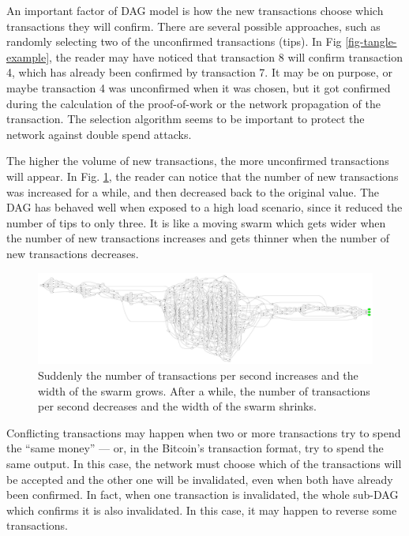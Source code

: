 An important factor of DAG model is how the new transactions choose which transactions they will confirm. There are several possible approaches, such as randomly selecting two of the unconfirmed transactions (tips). In Fig \ref{fig-tangle-example}, the reader may have noticed that transaction 8 will confirm transaction 4, which has already been confirmed by transaction 7. It may be on purpose, or maybe transaction 4 was unconfirmed when it was chosen, but it got confirmed during the calculation of the proof-of-work or the network propagation of the transaction. The selection algorithm seems to be important to protect the network against double spend attacks.

The higher the volume of new transactions, the more unconfirmed transactions will appear. In Fig. \ref{fig-tangle-swarm}, the reader can notice that the number of new transactions was increased for a while, and then decreased back to the original value. The DAG has behaved well when exposed to a high load scenario, since it reduced the number of tips to only three. It is like a moving swarm which gets wider when the number of new transactions increases and gets thinner when the number of new transactions decreases.

\begin{figure}[ht]
\centering\includegraphics[width=\textwidth]{./images01/fig-tangle-swarm.pdf}
\caption{Suddenly the number of transactions per second increases and the width of the swarm grows. After a while, the number of transactions per second decreases and the width of the swarm shrinks.\label{fig-tangle-swarm}}
\end{figure}

Conflicting transactions may happen when two or more transactions try to spend the ``same money'' --- or, in the Bitcoin's transaction format, try to spend the same output. In this case, the network must choose which of the transactions will be accepted and the other one will be invalidated, even when both have already been confirmed. In fact, when one transaction is invalidated, the whole sub-DAG which confirms it is also invalidated. In this case, it may happen to reverse some transactions.

